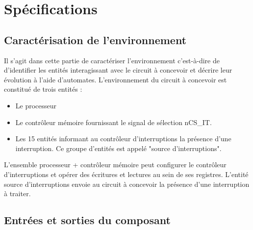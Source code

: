 \section{Spécifications}

\subsection{Caractérisation de l'environnement}

Il s'agit dans cette partie de caractériser l'environnement c'est-à-dire de d'identifier les entités interagissant avec le circuit à concevoir et décrire leur évolution à l'aide d'automates.
L'environnement du circuit à concevoir est constitué de trois entités :

\begin{itemize}
	\item Le processeur
	\item Le contrôleur mémoire fournissant le signal de sélection nCS\_IT.
	\item Les 15 entités informant au contrôleur d'interruptions la présence d'une interruption.
	Ce groupe d'entités est appelé "source d'interruptions".
\end{itemize}

L'ensemble processeur + contrôleur mémoire peut configurer le contrôleur d'interruptions et opérer des écritures et lectures au sein de ses registres. L'entité source d'interruptions envoie au circuit à concevoir la présence d'une interruption à traiter.


\subsection{Entrées et sorties du composant}